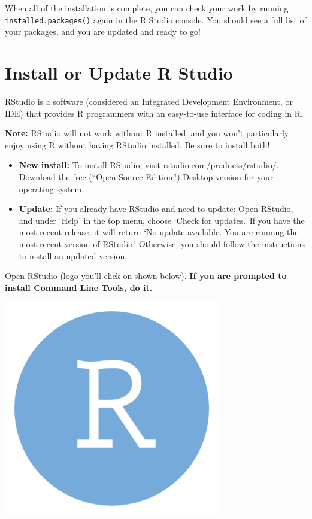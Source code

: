 \documentclass[
]{book}
\begin{document}
When all of the installation is complete, you can check your work by running \texttt{installed.packages()} again in the R Studio console. You should see a full list of your packages, and you are updated and ready to go!

\hypertarget{install-or-update-r-studio}{%
\section{Install or Update R Studio}\label{install-or-update-r-studio}}

RStudio is a software (considered an Integrated Development Environment, or IDE) that provides R programmers with an easy-to-use interface for coding in R.

\textbf{Note:} RStudio will not work without R installed, and you won't particularly enjoy using R without having RStudio installed. Be sure to install both!

\begin{itemize}
\item
  \textbf{New install:} To install RStudio, visit \href{https://www.rstudio.com/products/rstudio/}{rstudio.com/products/rstudio/}. Download the free (``Open Source Edition'') Desktop version for your operating system.
\item
  \textbf{Update:} If you already have RStudio and need to update: Open RStudio, and under `Help' in the top menu, choose `Check for updates.' If you have the most recent release, it will return `No update available. You are running the most recent version of RStudio.' Otherwise, you should follow the instructions to install an updated version.
\end{itemize}

Open RStudio (logo you'll click on shown below). \textbf{If you are prompted to install Command Line Tools, do it.}

\begin{center}\includegraphics{images/rstudio} \end{center}
\end{document}
